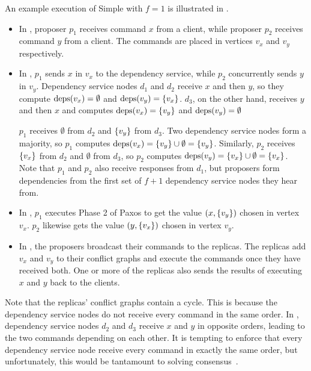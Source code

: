 An example execution of Simple \BPaxos{} with $f=1$ is illustrated in
.
\begin{itemize}
  \item
    In , proposer $p_1$ receives command $x$ from
    a client, while proposer $p_2$ receives command $y$ from a client. The
    commands are placed in vertices $v_x$ and $v_y$ respectively.

  \item
    In , $p_1$ sends $x$ in $v_x$ to the dependency
    service, while $p_2$ concurrently sends $y$ in $v_y$. Dependency service
    nodes $d_1$ and $d_2$ receive $x$ and then $y$, so they compute $\text{deps}(v_x)
    = \emptyset$ and $\text{deps}(v_y) = \{v_x\}$. $d_3$, on the other hand,
    receives $y$ and then $x$ and computes $\text{deps}(v_x) = \{v_y\}$ and
    $\text{deps}(v_y) = \emptyset$

    $p_1$ receives $\emptyset$ from $d_2$ and $\{v_y\}$ from $d_3$. Two
    dependency service nodes form a majority, so $p_1$ computes $\text{deps}(v_x) =
    \{v_y\} \cup \emptyset = \{v_y\}$. Similarly, $p_2$ receives
    $\{v_x\}$ from $d_2$ and $\emptyset$ from $d_3$, so $p_2$ computes
    $\text{deps}(v_y) = \{v_x\} \cup \emptyset = \{v_x\}$. Note that $p_1$ and
    $p_2$ also receive responses from $d_1$, but proposers form dependencies
    from the first set of $f+1$ dependency service nodes they hear from.

  \item
    In , $p_1$ executes Phase 2 of Paxos to get
    the value $(x, \{v_y\})$ chosen in vertex $v_x$. $p_2$ likewise gets the
    value $(y, \{v_x\})$ chosen in vertex $v_y$.

  \item
    In , the proposers broadcast their commands to
    the replicas. The replicas add $v_x$ and $v_y$ to their conflict graphs and
    execute the commands once they have received both. One or more of the
    replicas also sends the results of executing $x$ and $y$ back to the
    clients.
\end{itemize}

Note that the replicas' conflict graphs contain a cycle. This is because the
dependency service nodes do not receive every command in the same order. In
, dependency service nodes $d_2$ and $d_3$ receive
$x$ and $y$ in opposite orders, leading to the two commands depending on each
other. It is tempting to enforce that every dependency service node receive
every command in exactly the same order, but unfortunately, this would be
tantamount to solving consensus~\cite{chandra2007paxos}.

